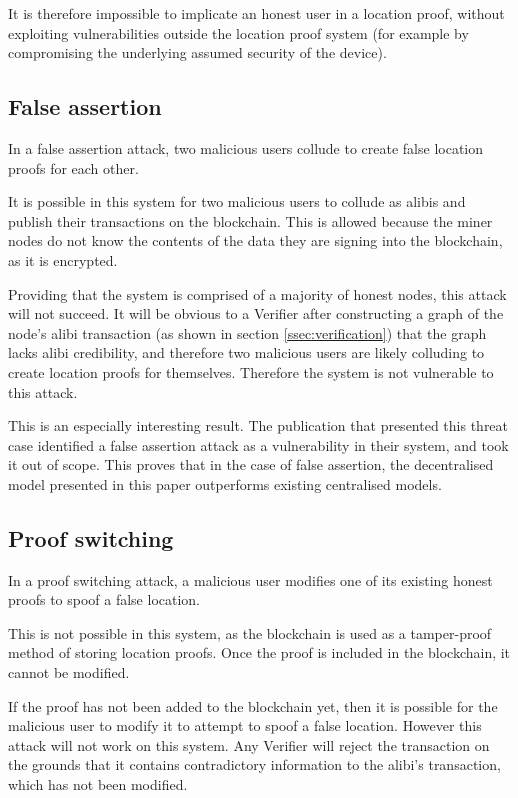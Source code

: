 It is therefore impossible to implicate an honest user in a location proof, without exploiting vulnerabilities outside the location proof system (for example by compromising the underlying assumed security of the device).

\subsection{False assertion}
In a false assertion attack, two malicious users collude to create false location proofs for each other.

It is possible in this system for two malicious users to collude as alibis and publish their transactions on the blockchain. This is allowed because the miner nodes do not know the contents of the data they are signing into the blockchain, as it is encrypted.

Providing that the system is comprised of a majority of honest nodes, this attack will not succeed. It will be obvious to a Verifier after constructing a graph of the node's alibi transaction (as shown in section \ref{ssec:verification}) that the graph lacks alibi credibility, and therefore two malicious users are likely colluding to create location proofs for themselves. Therefore the system is not vulnerable to this attack.

This is an especially interesting result. The publication that presented this threat case \cite{khan} identified a false assertion attack as a vulnerability in their system, and took it out of scope. This proves that in the case of false assertion, the decentralised model presented in this paper outperforms existing centralised models.

\subsection{Proof switching}
In a proof switching attack, a malicious user modifies one of its existing honest proofs to spoof a false location.

This is not possible in this system, as the blockchain is used as a tamper-proof method of storing location proofs. Once the proof is included in the blockchain, it cannot be modified.

If the proof has not been added to the blockchain yet, then it is possible for the malicious user to modify it to attempt to spoof a false location. However this attack will not work on this system. Any Verifier will reject the transaction on the grounds that it contains contradictory information to the alibi's transaction, which has not been modified.

